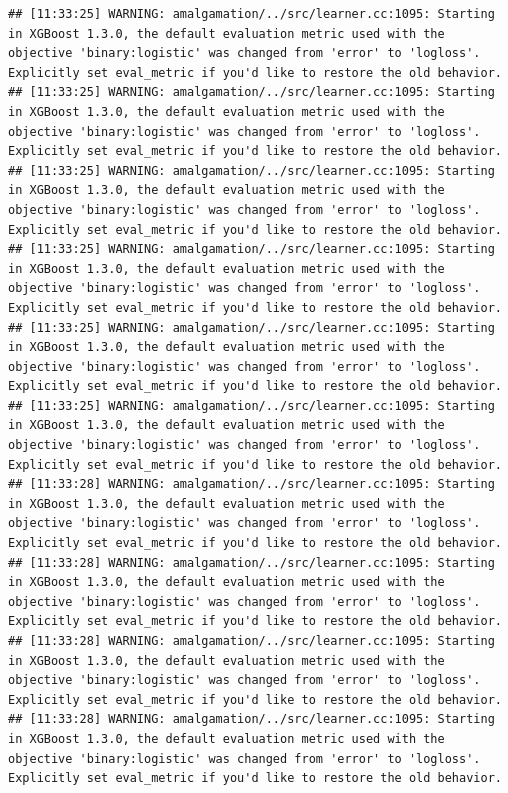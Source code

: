 \documentclass[
]{scrbook}
\begin{document}
\begin{verbatim}
## [11:33:25] WARNING: amalgamation/../src/learner.cc:1095: Starting in XGBoost 1.3.0, the default evaluation metric used with the objective 'binary:logistic' was changed from 'error' to 'logloss'. Explicitly set eval_metric if you'd like to restore the old behavior.
## [11:33:25] WARNING: amalgamation/../src/learner.cc:1095: Starting in XGBoost 1.3.0, the default evaluation metric used with the objective 'binary:logistic' was changed from 'error' to 'logloss'. Explicitly set eval_metric if you'd like to restore the old behavior.
## [11:33:25] WARNING: amalgamation/../src/learner.cc:1095: Starting in XGBoost 1.3.0, the default evaluation metric used with the objective 'binary:logistic' was changed from 'error' to 'logloss'. Explicitly set eval_metric if you'd like to restore the old behavior.
## [11:33:25] WARNING: amalgamation/../src/learner.cc:1095: Starting in XGBoost 1.3.0, the default evaluation metric used with the objective 'binary:logistic' was changed from 'error' to 'logloss'. Explicitly set eval_metric if you'd like to restore the old behavior.
## [11:33:25] WARNING: amalgamation/../src/learner.cc:1095: Starting in XGBoost 1.3.0, the default evaluation metric used with the objective 'binary:logistic' was changed from 'error' to 'logloss'. Explicitly set eval_metric if you'd like to restore the old behavior.
## [11:33:25] WARNING: amalgamation/../src/learner.cc:1095: Starting in XGBoost 1.3.0, the default evaluation metric used with the objective 'binary:logistic' was changed from 'error' to 'logloss'. Explicitly set eval_metric if you'd like to restore the old behavior.
## [11:33:28] WARNING: amalgamation/../src/learner.cc:1095: Starting in XGBoost 1.3.0, the default evaluation metric used with the objective 'binary:logistic' was changed from 'error' to 'logloss'. Explicitly set eval_metric if you'd like to restore the old behavior.
## [11:33:28] WARNING: amalgamation/../src/learner.cc:1095: Starting in XGBoost 1.3.0, the default evaluation metric used with the objective 'binary:logistic' was changed from 'error' to 'logloss'. Explicitly set eval_metric if you'd like to restore the old behavior.
## [11:33:28] WARNING: amalgamation/../src/learner.cc:1095: Starting in XGBoost 1.3.0, the default evaluation metric used with the objective 'binary:logistic' was changed from 'error' to 'logloss'. Explicitly set eval_metric if you'd like to restore the old behavior.
## [11:33:28] WARNING: amalgamation/../src/learner.cc:1095: Starting in XGBoost 1.3.0, the default evaluation metric used with the objective 'binary:logistic' was changed from 'error' to 'logloss'. Explicitly set eval_metric if you'd like to restore the old behavior.

\end{verbatim}
\end{document}
